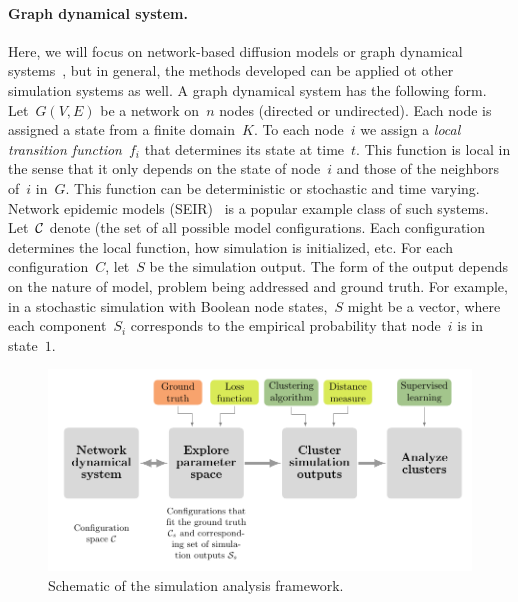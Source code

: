 \documentclass{article}
\begin{document}
\paragraph{Graph dynamical system.} Here, we will focus on network-based
diffusion models or graph dynamical systems~\cite{adiga2018graphical}, but
in general, the methods developed can be applied ot other simulation
systems as well. A graph dynamical system has the following form.
Let~$G(V,E)$ be a network on~$n$ nodes (directed or undirected). Each node
is assigned a state from a finite domain~$K$. To each node~$i$ we assign a
\emph{local transition function}~$f_i$ that determines its state at
time~$t$. This function is local in the sense that it only depends on the
state of node~$i$ and those of the neighbors of~$i$ in~$G$. This function
can be deterministic or stochastic and time varying. Network epidemic
models (SEIR)~\cite{newman2002spread} is a popular example class of such
systems. Let~$\mathcal{C}$ denote (the set of all possible model
configurations.  Each configuration determines the local function, how
simulation is initialized, etc. For each configuration~$C$, let~$S$ be the
simulation output. The form of the output depends on the nature of model,
problem being addressed and ground truth.  For example, in a stochastic
simulation with Boolean node states,~$S$ might be a vector, where each
component~$S_i$ corresponds to the empirical probability that node~$i$ is
in state~$1$.
\begin{figure}[htb]
\centering
\includegraphics[width=1\columnwidth]{figs/spread_analysis.pdf}
\caption{Schematic of the simulation analysis framework. \label{fig:clusterOutline}}
\end{figure}
\end{document}
